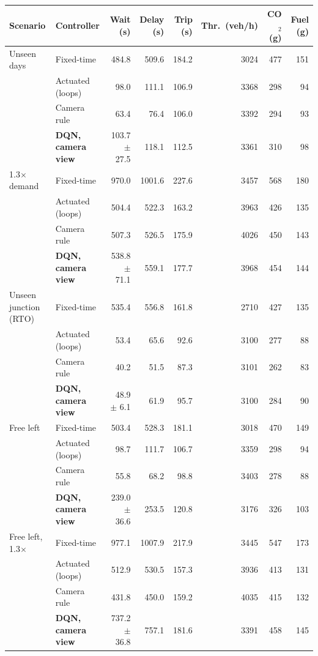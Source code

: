 \begin{tabular}{llrrrrrr}
\toprule
Scenario & Controller & Wait (s) & Delay (s) & Trip (s) & Thr.\ (veh/h) & CO$_2$ (g) & Fuel (g) \\
\midrule
Unseen days & Fixed-time & 484.8 & 509.6 & 184.2 & 3024 & 477 & 151 \\
 & Actuated (loops) & 98.0 & 111.1 & 106.9 & 3368 & 298 & 94 \\
\rowcolor{bench} & Camera rule & 63.4 & 76.4 & 106.0 & 3392 & 294 & 93 \\
\rowcolor{chosen} & \textbf{DQN, camera view} & 103.7 $\pm$ 27.5 & 118.1 & 112.5 & 3361 & 310 & 98 \\
\midrule
1.3$\times$ demand & Fixed-time & 970.0 & 1001.6 & 227.6 & 3457 & 568 & 180 \\
 & Actuated (loops) & 504.4 & 522.3 & 163.2 & 3963 & 426 & 135 \\
\rowcolor{bench} & Camera rule & 507.3 & 526.5 & 175.9 & 4026 & 450 & 143 \\
\rowcolor{chosen} & \textbf{DQN, camera view} & 538.8 $\pm$ 71.1 & 559.1 & 177.7 & 3968 & 454 & 144 \\
\midrule
Unseen junction (RTO) & Fixed-time & 535.4 & 556.8 & 161.8 & 2710 & 427 & 135 \\
 & Actuated (loops) & 53.4 & 65.6 & 92.6 & 3100 & 277 & 88 \\
\rowcolor{bench} & Camera rule & 40.2 & 51.5 & 87.3 & 3101 & 262 & 83 \\
\rowcolor{chosen} & \textbf{DQN, camera view} & 48.9 $\pm$ 6.1 & 61.9 & 95.7 & 3100 & 284 & 90 \\
\midrule
Free left & Fixed-time & 503.4 & 528.3 & 181.1 & 3018 & 470 & 149 \\
 & Actuated (loops) & 98.7 & 111.7 & 106.7 & 3359 & 298 & 94 \\
\rowcolor{bench} & Camera rule & 55.8 & 68.2 & 98.8 & 3403 & 278 & 88 \\
\rowcolor{chosen} & \textbf{DQN, camera view} & 239.0 $\pm$ 36.6 & 253.5 & 120.8 & 3176 & 326 & 103 \\
\midrule
Free left, 1.3$\times$ & Fixed-time & 977.1 & 1007.9 & 217.9 & 3445 & 547 & 173 \\
 & Actuated (loops) & 512.9 & 530.5 & 157.3 & 3936 & 413 & 131 \\
\rowcolor{bench} & Camera rule & 431.8 & 450.0 & 159.2 & 4035 & 415 & 132 \\
\rowcolor{chosen} & \textbf{DQN, camera view} & 737.2 $\pm$ 36.8 & 757.1 & 181.6 & 3391 & 458 & 145 \\
\bottomrule
\end{tabular}